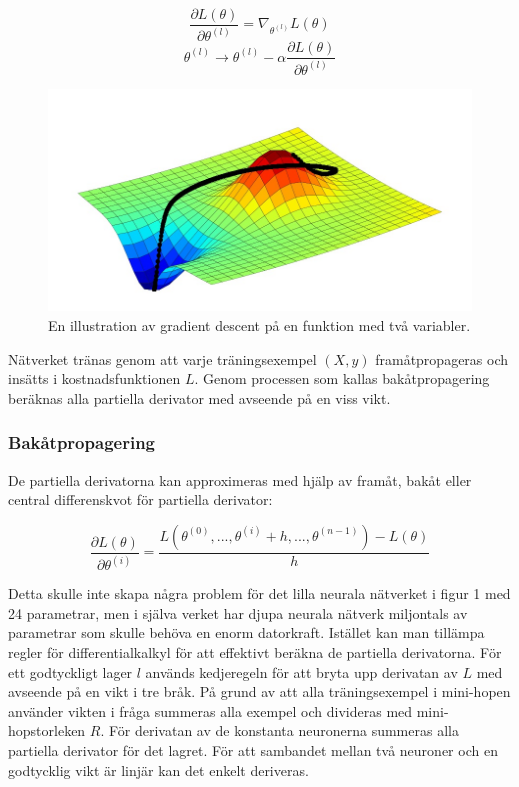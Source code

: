 \documentclass[a4paper,11pt,twoside]{article}
\newcommand*{\pd}[2]{\ensuremath{\dfrac{\partial #1}{\partial #2}}}
\begin{document}
\begin{equation}
\pd{L(\theta)}{\theta^{(l)}} = \nabla_{\theta^{(l)}} L(\theta)
\end{equation}
\begin{equation}\label{SGD}
\theta^{(l)} \to \theta^{(l)} - \alpha \pd{L(\theta)}{\theta^{(l)}}
\end{equation}
\begin{figure}[h]\label{figSGD}
	\centering
  		\includegraphics[scale=0.5]{SGD.png}
  	\caption{En illustration av gradient descent på en funktion med två variabler.\cite{figSGD}}
\end{figure}
Nätverket tränas genom att varje träningsexempel $(X,y)$ framåtpropageras och insätts i kostnadsfunktionen $L$. Genom processen som kallas bakåtpropagering beräknas alla partiella derivator med avseende på en viss vikt. \cite{gradient} \cite{convmath} \cite{wikiStanford}

\subsubsection{Bakåtpropagering}

De partiella derivatorna kan approximeras med hjälp av framåt, bakåt eller central differenskvot för partiella derivator: \cite{wikiStanford} \cite{gradient}

\begin{equation}
\pd{L(\theta)}{\theta^{(i)}} = \frac{L(\theta^{(0)},...,\theta^{(i)} + h, ..., \theta^{(n-1)})-L(\theta)}{h}
\end{equation}

Detta skulle inte skapa några problem för det lilla neurala nätverket i figur 1 med 24 parametrar, men i själva verket har djupa neurala nätverk miljontals av parametrar som skulle behöva en enorm datorkraft. Istället kan man tillämpa regler för differentialkalkyl för att effektivt beräkna de partiella derivatorna. För ett godtyckligt lager $l$ används kedjeregeln för att bryta upp derivatan av $L$ med avseende på en vikt i tre bråk. På grund av att alla träningsexempel i mini-hopen använder vikten i fråga summeras alla exempel och divideras med mini-hopstorleken $R$. För derivatan av de konstanta neuronerna summeras alla partiella derivator för det lagret. För att sambandet mellan två neuroner och en godtycklig vikt är linjär kan det enkelt deriveras. \cite{cs231n} \cite{convmath}
\end{document}
